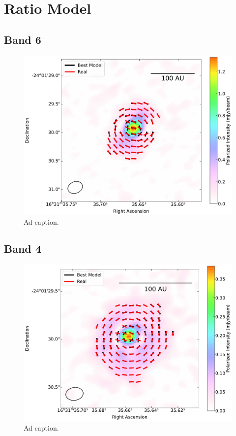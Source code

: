 \chapter{Ratio Model}
\label{ch4}

\section{Band 6}
\begin{figure}[h]
  \centering
  \includegraphics[width=2\textwidth]{WRITEUP_AND_IMAGES/IMAGES/IRS63_best_ratio_BAND6.pdf}
  \caption{Ad caption.}
  \label{fig: }
\end{figure}



\section{Band 4}
\begin{figure}[h]
  \centering
  \includegraphics[width=2\textwidth]{WRITEUP_AND_IMAGES/IMAGES/IRS63_best_ratio_BAND4.pdf}
  \caption{Ad caption.}
  \label{fig: }
\end{figure}